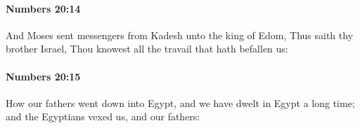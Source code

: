 		\paragraph{Numbers 20:14} %
			\label{NUMBERS-20-14}

			And Moses sent messengers from Kadesh unto the king of Edom, Thus saith thy brother Israel, Thou knowest all the travail that hath befallen us:


		\paragraph{Numbers 20:15} %
			\label{NUMBERS-20-15}

			How our fathers went down into Egypt, and we have dwelt in Egypt a long time; and the Egyptians vexed us, and our fathers:


